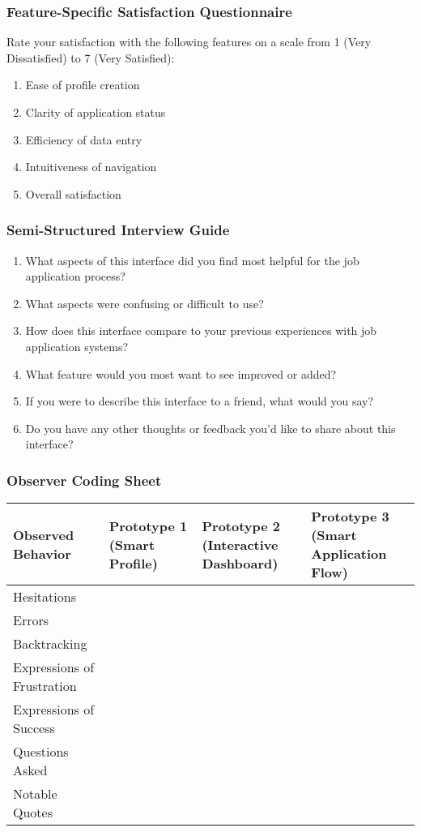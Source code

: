 \documentclass[
	letterpaper, %
]{jdf}
\begin{document}
\begin{sloppypar}
\subsubsection{Feature-Specific Satisfaction Questionnaire}

Rate your satisfaction with the following features on a scale from 1 (Very Dissatisfied) to 7 (Very Satisfied):

\begin{enumerate}
    \item Ease of profile creation
    \item Clarity of application status
    \item Efficiency of data entry
    \item Intuitiveness of navigation
    \item Overall satisfaction
\end{enumerate}

\subsubsection{Semi-Structured Interview Guide}

\begin{enumerate}
    \item What aspects of this interface did you find most helpful for the job application process?
    \item What aspects were confusing or difficult to use?
    \item How does this interface compare to your previous experiences with job application systems?
    \item What feature would you most want to see improved or added?
    \item If you were to describe this interface to a friend, what would you say?
    \item Do you have any other thoughts or feedback you'd like to share about this interface?
\end{enumerate}

\subsubsection{Observer Coding Sheet}

\begin{tabular}{|p{3cm}|p{3cm}|p{3cm}|p{3cm}|}
\hline
\textbf{Observed Behavior} & \textbf{Prototype 1 (Smart Profile)} & \textbf{Prototype 2 (Interactive Dashboard)} & \textbf{Prototype 3 (Smart Application Flow)} \\
\hline
Hesitations & & & \\
\hline
Errors & & & \\
\hline
Backtracking & & & \\
\hline
Expressions of Frustration & & & \\
\hline
Expressions of Success & & & \\
\hline
Questions Asked & & & \\
\hline
Notable Quotes & & & \\
\hline
\end{tabular}


\end{sloppypar}
\end{document}

